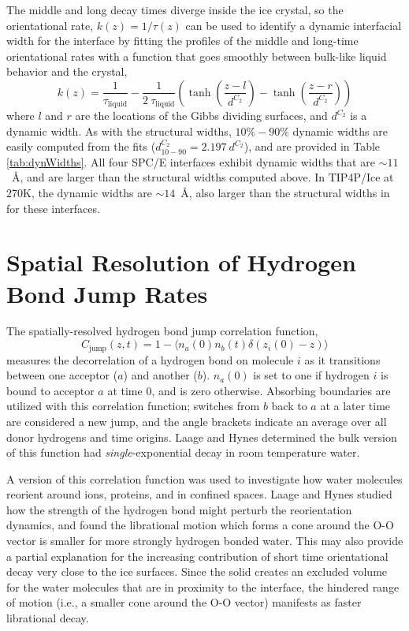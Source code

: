 The middle and long decay times diverge inside the ice crystal, so the
orientational rate, $k(z) = 1 / \tau(z)$ can be used to identify a
dynamic interfacial width for the interface by fitting the profiles of
the middle and long-time orientational rates with a function that goes
smoothly between bulk-like liquid behavior and the crystal,
\begin{equation}\label{tauFit}
  k(z) = \frac{1}{\tau_\mathrm{liquid}} - \frac{1}{2~\tau_\mathrm{liquid}} \left(
      \tanh \left( \frac{z-l}{d^{C_2}} \right) - \tanh \left( \frac{z-r}{d^{C_2}} \right) \right)
\end{equation}
where $l$ and $r$ are the locations of the Gibbs dividing surfaces,
and $d^{C_2}$ is a dynamic width.  As with the structural widths,
$10\%-90\%$ dynamic widths are easily computed from the fits
($d_\mathrm{10-90}^{C_2} = 2.197~d^{C_2}$), and are provided in Table
\ref{tab:dynWidths}. All four SPC/E interfaces exhibit dynamic widths
that are $\sim 11$~\AA, and are larger than the structural widths
computed above.  In TIP4P/Ice at 270K, the dynamic widths are
$\sim 14$~\AA, also larger than the structural widths in for these
interfaces.
 
\section{Spatial Resolution of Hydrogen Bond Jump Rates}
The spatially-resolved hydrogen bond jump correlation function,
\begin{equation}\label{jump}
C_\mathrm{jump}(z,t) = 1 - \langle n_a(0) n_b(t) \delta(z_i(0) - z) \rangle
\end{equation}
measures the decorrelation of a hydrogen bond on molecule $i$ as it
transitions between one acceptor ($a$) and another ($b$). $n_a(0)$ is
set to one if hydrogen $i$ is bound to acceptor $a$ at time $0$, and
is zero otherwise.  Absorbing boundaries are utilized with this
correlation function; switches from $b$ back to $a$ at a later time
are considered a new jump, and the angle brackets indicate an average
over all donor hydrogens and time origins. Laage and Hynes determined
the bulk version of this function had \textit{single}-exponential
decay in room temperature water.

A version of this correlation function was used to investigate how
water molecules reorient around
ions\cite{Laage2007,Laage2008a,Stirnemann2011a,Laage2011},
proteins\cite{Duboue-Dijon2014}, and in confined
spaces\cite{Laage2012b,Fogarty2014}.  Laage and Hynes studied how the
strength of the hydrogen bond might perturb the reorientation
dynamics,\cite{Laage2006a} and found the librational motion which
forms a cone around the O-O vector is smaller for more strongly
hydrogen bonded water. This may also provide a partial explanation for
the increasing contribution of short time orientational decay very
close to the ice surfaces.  Since the solid creates an excluded volume
for the water molecules that are in proximity to the interface, the
hindered range of motion (i.e., a smaller cone around the O-O vector)
manifests as faster librational decay.

